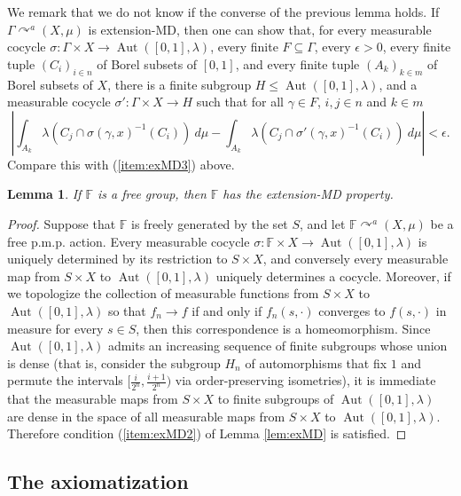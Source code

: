 \documentclass[12pt]{amsart}
\newtheorem{lem}[thm]{Lemma}
\theoremstyle{definition}
\def\bb{\mathbb}
\def\bb{\mathbb}
\DeclareMathOperator{\Aut}{Aut}
\newcommand{\pmp}{p{$.$}m{$.$}p{$.$}}
\newcommand{\acts}{\curvearrowright}
\begin{document}
We remark that we do not know if the converse of the previous lemma holds. If $\Gamma \acts^a (X, \mu)$ is extension-MD, then one can show that, for every measurable cocycle $\sigma : \Gamma \times X \rightarrow \Aut([0,1], \lambda)$, every finite $F \subseteq \Gamma$, every $\epsilon > 0$, every finite tuple $(C_i)_{i \in n}$ of Borel subsets of $[0,1]$, and every finite tuple $(A_k)_{k \in m}$ of Borel subsets of $X$, there is a finite subgroup $H \leq \Aut([0,1], \lambda)$, and a measurable cocycle $\sigma' : \Gamma \times X \rightarrow H$ such that for all $\gamma \in F$, $i,j \in n$ and $k \in m$
\[\left| \int_{A_k} \lambda(C_j \cap \sigma(\gamma, x)^{-1}(C_i)) \ d \mu - \int_{A_k} \lambda(C_j \cap \sigma'(\gamma, x)^{-1}(C_i)) \ d \mu \right| < \epsilon.\]
Compare this with (\ref{item:exMD3}) above.

\begin{lem}\label{freeweakMD}
    If $\bb F$ is a free group, then $\bb F$ has the extension-MD property.
\end{lem}

\begin{proof}
    Suppose that $\bb F$ is freely generated by the set $S$, and let $\bb F \acts^a (X, \mu)$ be a free {\pmp} action. Every measurable cocycle $\sigma : \bb F \times X \rightarrow \Aut([0,1], \lambda)$ is uniquely determined by its restriction to $S \times X$, and conversely every measurable map from $S \times X$ to $\Aut([0,1], \lambda)$ uniquely determines a cocycle. Moreover, if we topologize the collection of measurable functions from $S \times X$ to $\Aut([0,1], \lambda)$ so that $f_n \rightarrow f$ if and only if $f_n(s, \cdot)$ converges to $f(s, \cdot)$ in measure for every $s \in S$, then this correspondence is a homeomorphism. Since $\Aut([0,1], \lambda)$ admits an increasing sequence of finite subgroups whose union is dense (that is, consider the subgroup $H_n$ of automorphisms that fix $1$ and permute the intervals $[\frac{i}{2^n},\frac{i+1}{2^n})$ via order-preserving isometries), it is immediate that the measurable maps from $S \times X$ to finite subgroups of $\Aut([0,1], \lambda)$ are dense in the space of all measurable maps from $S \times X$ to $\Aut([0,1], \lambda)$. Therefore condition (\ref{item:exMD2}) of Lemma \ref{lem:exMD} is satisfied.
\end{proof}

\subsection{The axiomatization}
\end{document}

